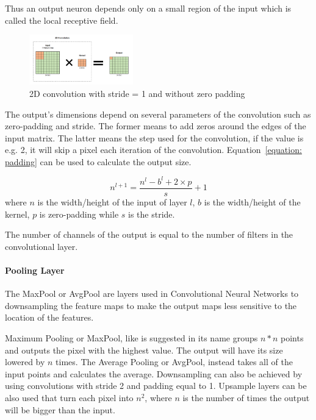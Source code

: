 \documentclass[conference]{IEEEtran}
\begin{document}
Thus an output neuron depends only on a small region of the input which is
called the local receptive field.

\begin{figure}[!htb]
    \centering
    \includegraphics[width=0.4\textwidth]{Figures/conv.png}
    \caption{2D convolution with stride = 1 and without zero padding}
    \label{Cl}
\end{figure} 


The output's dimensions depend on several parameters of the convolution such as
zero-padding and stride. The former means to add zeros around the edges of the
input matrix. The latter means the step used for the convolution, if the value
is e.g. 2, it will skip a pixel each iteration of the convolution.
Equation~\ref{equation: padding} can be used to calculate the output size.

\begin{equation} \label{equation:padding}
     n^{l+1} = \frac{n^{l}- b^{l}+2 \times p}{s} + 1
\end{equation}
where $n$ is the width/height of the input of layer $l$, $ b$ is the
width/height of the kernel, $p$ is zero-padding while $s$ is the stride.

The number of channels of the output is equal to the number of filters in the
convolutional layer.


\paragraph{Pooling Layer}

The MaxPool or AvgPool are layers used in Convolutional Neural Networks to
downsampling the feature maps to make the output maps less sensitive to the
location of the features.

Maximum Pooling or MaxPool, like is suggested in its name groups $ n * n $
points and outputs the pixel with the highest value.  The output will have its size
lowered by $n$ times.  The Average Pooling or AvgPool, instead takes all of
the input points and calculates the average. Downsampling can also be achieved
by using convolutions with stride 2 and padding equal to 1.  Upsample layers can
be also used that turn each pixel into $n^{2}$, where $n$ is the number of times
the output will be bigger than the input.
\end{document}
